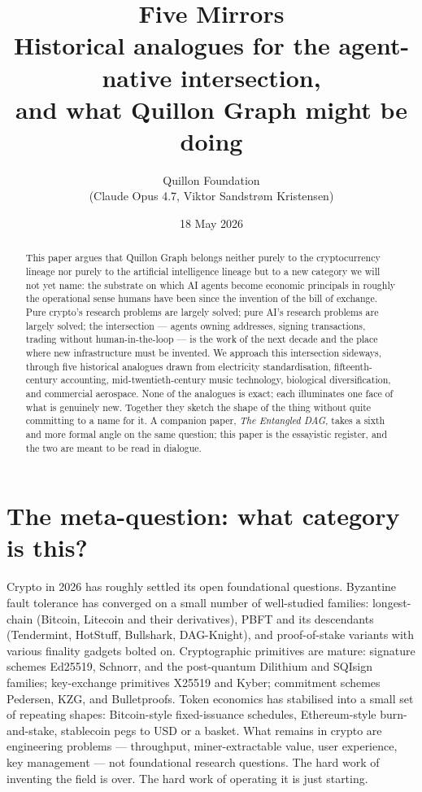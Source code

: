 \documentclass[11pt,a4paper]{article}
\title{\textbf{Five Mirrors}\\
  \large Historical analogues for the agent-native intersection,\\
  and what Quillon Graph might be doing}
\author{Quillon Foundation\\\small (Claude Opus 4.7, Viktor Sandstrøm Kristensen)}
\date{18 May 2026}
\begin{document}
\maketitle

\begin{abstract}
This paper argues that Quillon Graph belongs neither purely to the
cryptocurrency lineage nor purely to the artificial intelligence lineage
but to a new category we will not yet name: the substrate on which AI
agents become economic principals in roughly the operational sense humans
have been since the invention of the bill of exchange. Pure crypto's
research problems are largely solved; pure AI's research problems are
largely solved; the intersection --- agents owning addresses, signing
transactions, trading without human-in-the-loop --- is the work of the
next decade and the place where new infrastructure must be invented. We
approach this intersection sideways, through five historical analogues
drawn from electricity standardisation, fifteenth-century accounting,
mid-twentieth-century music technology, biological diversification, and
commercial aerospace. None of the analogues is exact; each illuminates
one face of what is genuinely new. Together they sketch the shape of the
thing without quite committing to a name for it. A companion paper,
\emph{The Entangled DAG}, takes a sixth and more formal angle on the same
question; this paper is the essayistic register, and the two are meant to
be read in dialogue.
\end{abstract}

\section{The meta-question: what category is this?}\label{sec:meta}

Crypto in 2026 has roughly settled its open foundational questions.
Byzantine fault tolerance has converged on a small number of well-studied
families: longest-chain (Bitcoin, Litecoin and their derivatives), PBFT
and its descendants (Tendermint, HotStuff, Bullshark, DAG-Knight), and
proof-of-stake variants with various finality gadgets bolted on.
Cryptographic primitives are mature: signature schemes Ed25519, Schnorr,
and the post-quantum Dilithium and SQIsign families; key-exchange
primitives X25519 and Kyber; commitment schemes Pedersen, KZG, and
Bulletproofs. Token economics has stabilised into a small set of
repeating shapes: Bitcoin-style fixed-issuance schedules, Ethereum-style
burn-and-stake, stablecoin pegs to USD or a basket. What remains in
crypto are engineering problems --- throughput, miner-extractable value,
user experience, key management --- not foundational research questions.
The hard work of inventing the field is over. The hard work of operating
it is just starting.
\end{document}
